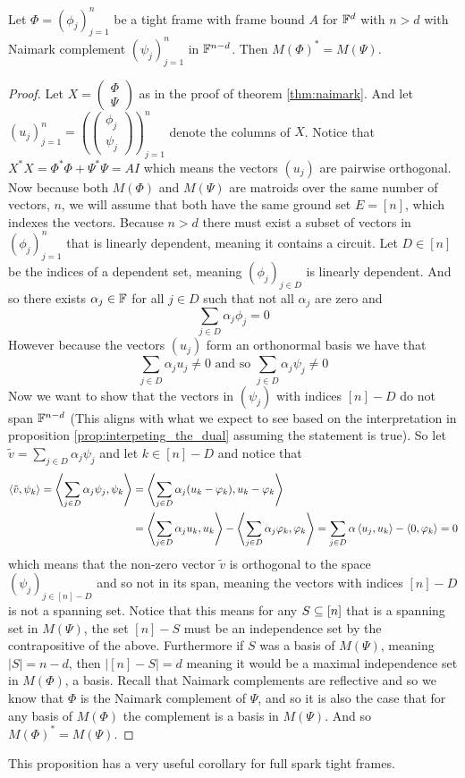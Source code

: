 \begin{prop}
\label{prop:naimark_comp_has_matroid_dual}
    Let $\Phi=(\phi_j)_{j=1}^n$ be a tight frame with frame bound $A$ for $\mathbb{F}^d$ with $n>d$ with Naimark complement $(\psi_j)_{j=1}^n$ in $\mathbb{F}^{n-d}$. Then $M(\Phi)^*=M(\Psi)$.
\end{prop}
\begin{proof}
    Let $X=\begin{pmatrix}\Phi\\\Psi\end{pmatrix}$ as in the proof of theorem \ref{thm:naimark}. 
    And let $(u_j)_{j=1}^n=\left(\begin{pmatrix}\phi_j\\\psi_j\end{pmatrix}\right)_{j=1}^n$ denote the columns of $X$. Notice that $X^*X=\Phi^*\Phi+\Psi^*\Psi=AI$ which means the vectors $(u_j)$ are pairwise orthogonal. Now because both $M(\Phi)$ and $M(\Psi)$ are matroids over the same number of vectors, $n$, we will assume that both have the same ground set $E=[n]$, which indexes the vectors. Because $n>d$ there must exist a subset of vectors in $(\phi_j)_{j=1}^n$ that is linearly dependent, meaning it contains a circuit. Let $D\in[n]$ be the indices of a dependent set, meaning $(\phi_j)_{j\in D}$ is linearly dependent. And so there exists $\alpha_j\in \mathbb{F}$ for all $j\in D$ such that not all $\alpha_j$ are zero and
    $$\sum_{j\in D}\alpha_j\phi_j=0$$
    However because the vectors $(u_j)$ form an orthonormal basis we have that
    $$\sum_{j\in D}\alpha_ju_j\neq 0\text{ and so }\sum_{j\in D}\alpha_j\psi_j\neq 0$$
    Now we want to show that the vectors in $(\psi_j)$ with indices $[n]-D$ do not span $\mathbb{F}^{n-d}$ (This aligns with what we expect to see based on the interpretation in proposition \ref{prop:interpeting_the_dual} assuming the statement is true). So let $\tilde{v}=\sum_{j\in D}\alpha_j\psi_j$ and let $k\in [n]-D$ and notice that 
    \begin{align*}
        \left\langle \tilde{v},\psi_k \right\rangle=\left\langle \sum_{j\in D}\alpha_j\psi_j,\psi_k \right\rangle&=\left\langle \sum_{j\in D}\alpha_j(u_k-\varphi_k),u_k-\varphi_k \right\rangle\\
        &=\left\langle \sum_{j\in D}\alpha_ju_k,u_k \right\rangle-\left\langle \sum_{j\in D}\alpha_j\varphi_k,\varphi_k \right\rangle=\sum_{j\in D}\alpha\left\langle u_j,u_k \right\rangle-\left\langle 0,\varphi_k \right\rangle=0
    \end{align*}
    which means that the non-zero vector $\tilde{v}$ is orthogonal to the space $(\psi_j)_{j\in[n]-D}$ and so not in its span, meaning the vectors with indices $[n]-D$ is not a spanning set. Notice that this means for any $S\subseteq [n]$ that is a spanning set in $M(\Psi)$, the set $[n]-S$ must be an independence set by the contrapositive of the above. Furthermore if $S$ was a basis of $M(\Psi)$, meaning $|S|=n-d$, then $|[n]-S|=d$ meaning it would be a maximal independence set in $M(\Phi)$, a basis. Recall that Naimark complements are reflective and so we know that $\Phi$ is the Naimark complement of $\Psi$, and so it is also the case that for any basis of $M(\Phi)$ the complement is a basis in $M(\Psi)$. And so $M(\Phi)^*=M(\Psi)$.
\end{proof}
This proposition has a very useful corollary for full spark tight frames.

